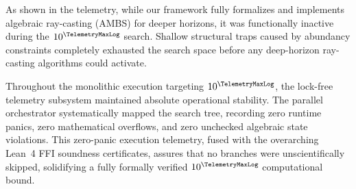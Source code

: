 As shown in the telemetry, while our framework fully formalizes and
implements algebraic ray-casting (AMBS) for deeper horizons, it was
functionally inactive during the $10^{\TelemetryMaxLog}$ search. Shallow structural
traps caused by abundancy constraints completely exhausted the search
space before any deep-horizon ray-casting algorithms could activate.

Throughout the monolithic execution targeting $10^{\TelemetryMaxLog}$, the lock-free
telemetry subsystem maintained absolute operational stability.  The
parallel orchestrator systematically mapped the search tree, recording
zero runtime panics, zero mathematical overflows, and zero unchecked
algebraic state violations.  This zero-panic execution telemetry, fused
with the overarching Lean~4 FFI soundness certificates, assures that no
branches were unscientifically skipped, solidifying a fully formally verified
$10^{\TelemetryMaxLog}$ computational bound.
